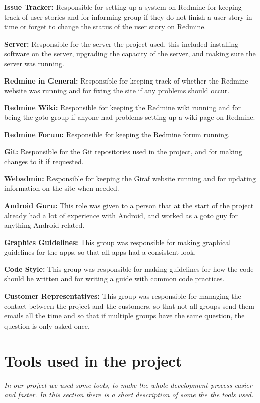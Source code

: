 \textbf{Issue Tracker:}
Responsible for setting up a system on Redmine for keeping track of user stories and for informing group if they do not finish a user story in time or forget to change the status of the user story on Redmine.

\textbf{Server:}
Responsible for the server the project used, this included installing software on the server, upgrading the capacity of the server, and making sure the server was running.

\textbf{Redmine in General:}
Responsible for keeping track of whether the Redmine website was running and for fixing the site if any problems should occur.

\textbf{Redmine Wiki:}
Responsible for keeping the Redmine wiki running and for being the goto group if anyone had problems setting up a wiki page on Redmine.

\textbf{Redmine Forum:}
Responsible for keeping the Redmine forum running.
 
\textbf{Git:}
Responsible for the Git repositories used in the project, and for making changes to it if requested.

\textbf{Webadmin:}
Responsible for keeping the Giraf website running and for updating information on the site when needed. %

\textbf{Android Guru:}
This role was given to a person that at the start of the project already had a lot of experience with Android, and worked as a goto guy for anything Android related.

\textbf{Graphics Guidelines:}
This group was responsible for making graphical guidelines for the apps, so that all apps had a consistent look.

\textbf{Code Style:}
This group was responsible for making guidelines for how the code should be written and for writing a guide with common code practices.

\textbf{Customer Representatives:}
This group was responsible for managing the contact between the project and the customers, so that not all groups send them emails all the time and so that if multiple groups have the same question, the question is only asked once.

\section{Tools used in the project}
\textit{In our project we used some tools, to make the whole development process easier and faster. In this section there is a short description of some the the tools used.}

